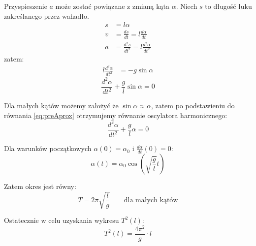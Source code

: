 \documentclass[a4paper,12pt]{article}
\begin{document}
Przyspieszenie $a$ może zostać powiązane z zmianą kąta $\alpha$. Niech $s$ to długość łuku
zakreślanego przez wahadło.
\begin{align*}
		s &= l\alpha\\
		v &= \frac{ds}{dt} = l \frac{d\alpha}{dt}\\
		a &= \frac{d^2s}{dt^2} = l \frac{d^2 \alpha}{d t^2}
\end{align*}
zatem:
\begin{align*}
		l \frac{d^2 \alpha}{d t^2} &= -g \sin \alpha
\end{align*}
\begin{equation}
		\frac{d^2 \alpha}{d t^2} + \frac{g}{l}\sin \alpha = 0
		\label{eq:preAprox}
\end{equation}

Dla małych kątów możemy założyć że $\sin \alpha\approx \alpha$, zatem po podstawieniu do równania
\ref{eq:preAprox} otrzymujemy równanie oscylatora harmonicznego:
\[ \frac{d^2 \alpha}{d t^2} + \frac{g}{l} \alpha = 0 \]

Dla warunków początkowych $\alpha \left( 0 \right) = \alpha_0$ i $\frac{d\alpha}{dt}\left( 0 \right) = 0$:
\[ \alpha \left( t \right) = \alpha_0 \cos\left(\sqrt{\frac{g}{l}}t \right) \]

Zatem okres jest równy:
\begin{equation}
		T = 2\pi \sqrt{\frac{l}{g}} \qquad \text{dla małych kątów}
		\label{eq:okres}
\end{equation}

Ostatecznie w celu uzyskania wykresu $T^2 \left(l\right)$:
\begin{equation}
		T^2\left( l \right) = \frac{4\pi^2}{g}  \cdot l
		\label{eq:wykres}
\end{equation}
\end{document}
